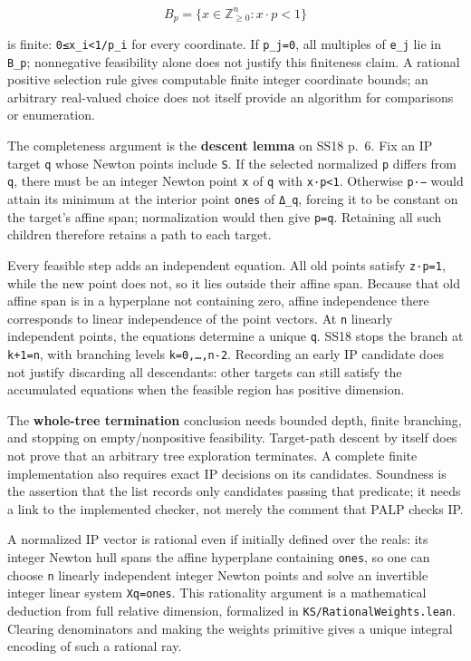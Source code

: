 \documentclass[11pt,a4paper,oneside]{report}
\begin{document}
\[
B_p=\{x\in\mathbb Z_{\ge0}^n:x\cdot p<1\}
\]

is finite: \texttt{0≤x\_\allowbreak{}i<1/\allowbreak{}p\_\allowbreak{}i}
for every coordinate. If \texttt{p\_\allowbreak{}j=\allowbreak{}0}, all
multiples of \texttt{e\_\allowbreak{}j} lie in
\texttt{B\_\allowbreak{}p}; nonnegative feasibility alone does not
justify this finiteness claim. A rational positive selection rule gives
computable finite integer coordinate bounds; an arbitrary real-valued
choice does not itself provide an algorithm for comparisons or
enumeration.

The completeness argument is the \textbf{descent lemma} on SS18 p.~6.
Fix an IP target \texttt{q} whose Newton points include \texttt{S}. If
the selected normalized \texttt{p} differs from \texttt{q}, there must
be an integer Newton point \texttt{x} of \texttt{q} with \texttt{x·p<1}.
Otherwise \texttt{p·−} would attain its minimum at the interior point
\texttt{ones} of \texttt{Δ\_\allowbreak{}q}, forcing it to be constant
on the target's affine span; normalization would then give
\texttt{p=\allowbreak{}q}. Retaining all such children therefore retains
a path to each target.

Every feasible step adds an independent equation. All old points satisfy
\texttt{z·p=\allowbreak{}1}, while the new point does not, so it lies
outside their affine span. Because that old affine span is in a
hyperplane not containing zero, affine independence there corresponds to
linear independence of the point vectors. At \texttt{n} linearly
independent points, the equations determine a unique \texttt{q}. SS18
stops the branch at \texttt{k+1=\allowbreak{}n}, with branching levels
\texttt{k=\allowbreak{}0,\allowbreak{}…,\allowbreak{}n-\allowbreak{}2}.
Recording an early IP candidate does not justify discarding all
descendants: other targets can still satisfy the accumulated equations
when the feasible region has positive dimension.

The \textbf{whole-tree termination} conclusion needs bounded depth,
finite branching, and stopping on empty/nonpositive feasibility.
Target-path descent by itself does not prove that an arbitrary tree
exploration terminates. A complete finite implementation also requires
exact IP decisions on its candidates. Soundness is the assertion that
the list records only candidates passing that predicate; it needs a link
to the implemented checker, not merely the comment that PALP checks IP.

A normalized IP vector is rational even if initially defined over the
reals: its integer Newton hull spans the affine hyperplane containing
\texttt{ones}, so one can choose \texttt{n} linearly independent integer
Newton points and solve an invertible integer linear system
\texttt{Xq=\allowbreak{}ones}. This rationality argument is a
mathematical deduction from full relative dimension, formalized in
\texttt{KS/\allowbreak{}Rational\allowbreak{}Weights.\allowbreak{}lean}.
Clearing denominators and making the weights primitive gives a unique
integral encoding of such a rational ray.
\end{document}
